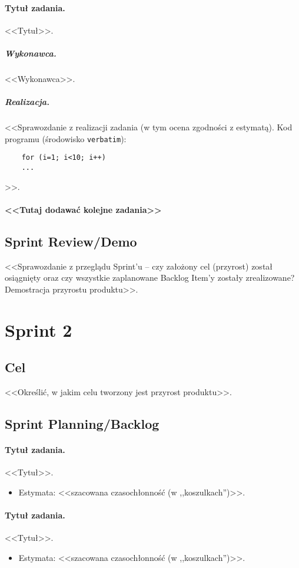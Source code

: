 \documentclass[a4paper]{article}
\begin{document}
	\paragraph{Tytuł zadania.} <<Tytuł>>.
	\subparagraph{Wykonawca.} <<Wykonawca>>.
	\subparagraph{Realizacja.} <<Sprawozdanie z realizacji zadania (w tym ocena zgodności z estymatą). Kod programu (środowisko \texttt{verbatim}): \begin{verbatim}
	for (i=1; i<10; i++)
	...
	\end{verbatim}>>.
	
	\paragraph{<<Tutaj dodawać kolejne zadania>>}
	
	
	\subsection{Sprint Review/Demo}
	<<Sprawozdanie z przeglądu Sprint'u -- czy założony cel (przyrost) został osiągnięty oraz czy wszystkie zaplanowane Backlog Item'y zostały zrealizowane? Demostracja przyrostu produktu>>.
	
	\section{Sprint 2}
	
	\subsection{Cel} <<Określić, w jakim celu tworzony jest przyrost produktu>>.
	
	\subsection{Sprint Planning/Backlog}
	
	\paragraph{Tytuł zadania.} <<Tytuł>>.
	\begin{itemize}
		\item Estymata: <<szacowana czasochłonność (w ,,koszulkach'')>>.
	\end{itemize}
	
	\paragraph{Tytuł zadania.} <<Tytuł>>.
	\begin{itemize}
		\item Estymata: <<szacowana czasochłonność (w ,,koszulkach'')>>.
	\end{itemize}
	
\end{document}
